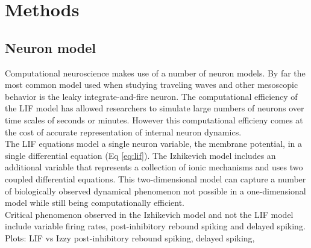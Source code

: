 
\chapter{Methods}

\section{Neuron model}
Computational neuroscience makes use of a number of neuron models.
By far the most common model used when studying traveling waves and other mesoscopic behavior is the leaky integrate-and-fire neuron.
The computational efficiency of the LIF model has allowed researchers to simulate large numbers of neurons over time scales of seconds or minutes.
However this computational efficieny comes at the cost of accurate representation of internal neuron dynamics.
\\
The LIF equations model a single neuron variable, the membrane potential, in a single differential equation (Eq \ref{eq:lif}).
The Izhikevich model includes an additional variable that represents a collection of ionic mechanisms and uses two coupled differential equations.
This two-dimensional model can capture a number of biologically observed dynamical phenomenon not possible in a one-dimensional model while still being computationally efficient.
\\
Critical phenomenon observed in the Izhikevich model and not the LIF model include variable firing rates, post-inhibitory rebound spiking and delayed spiking.
Plots: LIF vs Izzy post-inhibitory rebound spiking, delayed spiking, 

